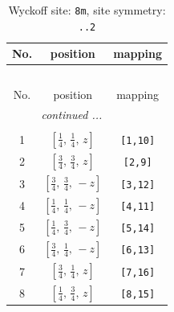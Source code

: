 \documentclass[fleqn,8pt]{jsarticle}
\begin{document}
\renewcommand{\arraystretch}{1.2}
\begin{longtable}{ccc}
\caption{Wyckoff site: {\tt 8m}, site symmetry: {\tt ..2}}
 \\
 \hline \hline
No. & position & mapping \\ \hline \endfirsthead

\multicolumn{2}{l}{\tablename\ \thetable{}} \\
 \hline \hline
No. & position & mapping \\ \hline \endhead

 \hline \hline
\multicolumn{2}{r}{\footnotesize\it continued ...} \\ \endfoot

 \hline \hline
\multicolumn{2}{r}{} \\ \endlastfoot

1 & $\left[ \frac{1}{4},\, \frac{1}{4},\, z \right]$ & {\tt [1,10]} \\ \hline
2 & $\left[ \frac{3}{4},\, \frac{3}{4},\, z \right]$ & {\tt [2,9]} \\ \hline
3 & $\left[ \frac{3}{4},\, \frac{3}{4},\, - z \right]$ & {\tt [3,12]} \\ \hline
4 & $\left[ \frac{1}{4},\, \frac{1}{4},\, - z \right]$ & {\tt [4,11]} \\ \hline
5 & $\left[ \frac{1}{4},\, \frac{3}{4},\, - z \right]$ & {\tt [5,14]} \\ \hline
6 & $\left[ \frac{3}{4},\, \frac{1}{4},\, - z \right]$ & {\tt [6,13]} \\ \hline
7 & $\left[ \frac{3}{4},\, \frac{1}{4},\, z \right]$ & {\tt [7,16]} \\ \hline
8 & $\left[ \frac{1}{4},\, \frac{3}{4},\, z \right]$ & {\tt [8,15]} \\
\end{longtable}
\renewcommand{\arraystretch}{1.2}
\end{document}
